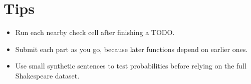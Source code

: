 \documentclass[11pt]{article}
\begin{document}
\section*{Tips}
\begin{itemize}
  \item Run each nearby check cell after finishing a TODO.
  \item Submit each part as you go, because later functions depend on earlier ones.
  \item Use small synthetic sentences to test probabilities before relying on the full Shakespeare dataset.
\end{itemize}
\end{document}
